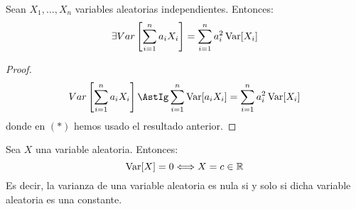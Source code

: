 \begin{coro}
    Sean $X_1,\dots,X_n$ variables aleatorias independientes. Entonces:
    \begin{equation*}
        \exists  Var\left[\sum_{i=1}^n a_iX_i\right] = \sum_{i=1}^n a_i^2 \operatorname{Var}[X_i]
    \end{equation*}
\end{coro}
\begin{proof}
    \begin{equation*}
        Var\left[\sum_{i=1}^n a_iX_i\right]
        \AstIg \sum_{i=1}^n \Var[a_iX_i]
        = \sum_{i=1}^n a_i^2 \Var[X_i]
    \end{equation*}
    donde en $(\ast)$ hemos usado el resultado anterior.
\end{proof}


\begin{prop}\label{prop:6.13}
    Sea $X$ una variable aleatoria. Entonces:
    \begin{equation*}
        \operatorname{Var}[X]=0 \Longleftrightarrow X=c\in \mathbb{R}
    \end{equation*}
    Es decir, la varianza de una variable aleatoria es nula si y solo si dicha variable aleatoria es una constante.
\end{prop}
